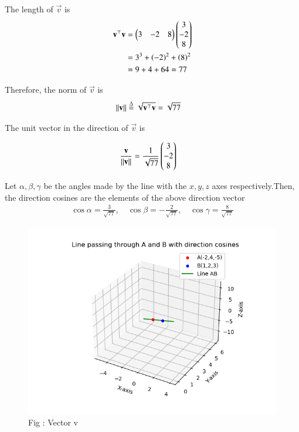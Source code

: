 \documentclass[journal]{IEEEtran}
\begin{document}
The length of $\vec{v}$ is
\begin{align*}
\mathbf{v}^\top \mathbf{v} &= \begin{pmatrix}3 & -2 & 8\end{pmatrix}\begin{pmatrix}3 \\ -2 \\ 8\end{pmatrix} \\
&= 3^3 + \left(-2\right)^2 + \left(8\right)^2 \\
&= 9 + 4 + 64 = 77
\end{align*}

Therefore, the norm of $\vec{v}$ is
\begin{align*}
\left\lVert\mathbf{v}\right\rVert &\overset{\Delta}{=} \sqrt{\mathbf{v}^\top \mathbf{v}} = \sqrt{77} 
\end{align*} 

The unit vector in the direction of $\vec{v}$ is  

\begin{align*} 
\frac{\mathbf{v}}{\left\lVert\mathbf{v}\right\rVert}
&= \frac{1}{\sqrt{77}}\begin{pmatrix}3 \\ -2 \\ 8\end{pmatrix}
\end{align*}

Let $\alpha,\beta,\gamma$ be the angles made by the line with the $x,y,z$ axes respectively.Then, the direction cosines are the elements of the above direction vector
\begin{align*}
\cos\alpha = \frac{3}{\sqrt{77}}, \quad
\cos\beta = -\frac{2}{\sqrt{77}}, \quad
\cos\gamma = \frac{8}{\sqrt{77}}
\end{align*}

\begin{figure}[h!]
  \centering
  \includegraphics[width=0.9\columnwidth]{figs/fig_vector.png} 
   \caption*{Fig : Vector v}
  \label{Fig1}
\end{figure}
\end{document}
